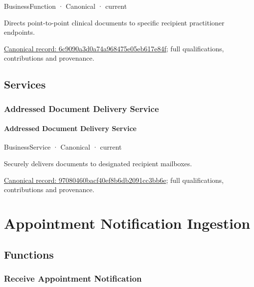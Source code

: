 \label{element:6c9090a3d0a74a968475e05eb617e84f}
{\small BusinessFunction · Canonical · current}\par

Directs point-to-point clinical documents to specific recipient practitioner endpoints.


{\footnotesize \href{../../../../continuum/business/business-function/6c9090a3d0a74a968475e05eb617e84f.md}{Canonical record: 6c9090a3d0a74a968475e05eb617e84f}; full qualifications, contributions and provenance.}\par
\subsection{Services}

\subsubsection{Addressed Document Delivery Service}

\paragraph{Addressed Document Delivery Service}

\label{element:97080460bacf40ef8b6db2091cc3bb6e}
{\small BusinessService · Canonical · current}\par

Securely delivers documents to designated recipient mailboxes.


{\footnotesize \href{../../../../continuum/business/business-service/97080460bacf40ef8b6db2091cc3bb6e.md}{Canonical record: 97080460bacf40ef8b6db2091cc3bb6e}; full qualifications, contributions and provenance.}\par
\section{Appointment Notification Ingestion}

\subsection{Functions}

\subsubsection{Receive Appointment Notification}

